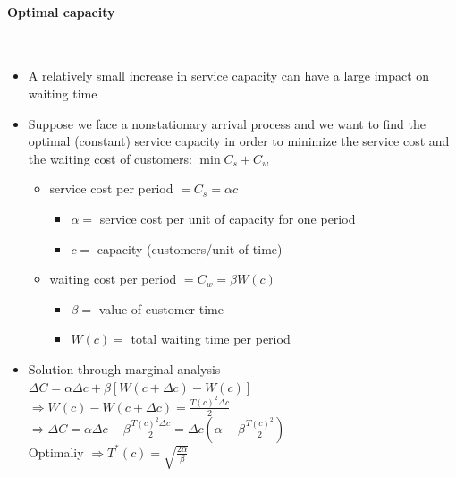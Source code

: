 \documentclass[paper=a4,fontsize=8pt,pagesize,DIV=calc]{scrartcl}
\newcounter{row}
\begin{document}
\begin{multicols}{3}
\paragraph{Optimal capacity}~~\\
\begin{itemize}
\item A relatively small increase in service capacity can have a large impact on waiting time
\item Suppose we face a nonstationary arrival process and we want to find the optimal (constant) service capacity in order to minimize the service cost and the waiting cost of customers: $\min C_s + C_w$
\begin{itemize}
\item service cost per period $= C_s =\alpha c$
\begin{itemize}
\item $\alpha =$ service cost per unit of capacity for one period
\item $c=$ capacity (customers/unit of time)
\end{itemize}
\item waiting cost per period $= C_w =\beta W(c)$
\begin{itemize}
\item $\beta =$ value of customer time
\item $W(c) =$ total waiting time per period
\end{itemize}
\end{itemize}
\item Solution through marginal analysis
\\ $\Delta C = \alpha \Delta c + \beta [W(c+\Delta c) -W(c)]$
\\$\Rightarrow W(c)-W(c+\Delta c)=\frac{T(c)^2 \Delta c}{2}$
\\$\Rightarrow \Delta C=\alpha \Delta c-\beta \frac{T(c)^2 \Delta c}{2}=\Delta c \left(\alpha -\beta \frac{T(c)^2}{2}\right)$
\\Optimaliy $\Rightarrow T^*(c)=\sqrt{\frac{2\alpha}{\beta}} $ 
\end{itemize}

\end{multicols}
\end{document}
